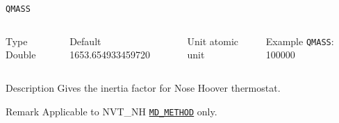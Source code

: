\begin{frame}[allowframebreaks]{\texttt{QMASS}} \label{QMASS}
\vspace*{-12pt}
\begin{columns}
\begin{block}{Type}
Double
\end{block}

\begin{block}{Default}
1653.654933459720
\end{block}

\begin{block}{Unit}
atomic unit
\end{block}

\begin{block}{Example}
\texttt{QMASS}: 100000
\end{block}
\end{columns}

\begin{block}{Description}
Gives the inertia factor for Nose Hoover thermostat.
\end{block}

\begin{block}{Remark}
Applicable to NVT\_NH \hyperlink{MD_METHOD}{\texttt{MD\_METHOD}} only.
\end{block}

\end{frame}



